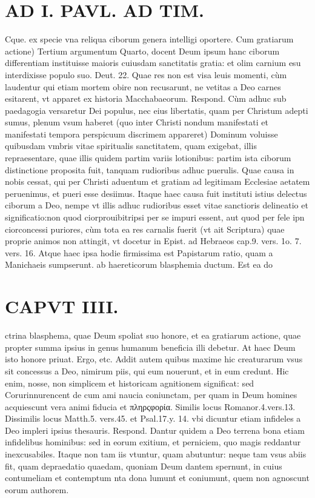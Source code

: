 \documentclass{article}
\begin{document}
\begin{pages}
\section*{AD I. PAVL. AD TIM. }
\marginpar{[ p.194 ]}\pstart Cque. ex specie vna reliqua ciborum genera intelligi oportere.  \pend\pstart Cum gratiarum actione) Tertium argumentum  \pend\pstart Quarto, docent Deum ipsum hanc ciborum differentiam instituisse maioris cuiusdam sanctitatis gratia: et olim carnium esu interdixisse populo suo. Deut. 22. Quae res non est visa leuis momenti, cùm laudentur qui etiam mortem obire non recusarunt, ne vetitas a Deo carnes esitarent, vt apparet ex historia Macchabaeorum. Respond. Cùm adhuc sub paedagogia versaretur Dei populus, nec eius libertatis, quam per Christum adepti sumus, plenum vsum haberet (quo inter Christi nondum manifestati et manifestati tempora perspicuum discrimem appareret) Dominum voluisse quibusdam vmbris vitae spiritualis sanctitatem, quam exigebat, illis repraesentare, quae illis quidem partim variis lotionibus: partim ista ciborum distinctione proposita fuit, tanquam rudioribus adhuc puerulis. Quae causa in nobis cessat, qui per Christi aduentum et gratiam ad legitimam Ecclesiae aetatem peruenimus, et pueri esse desiimus. Itaque haec causa fuit instituti istius delectus ciborum a Deo, nempe vt illis adhuc rudioribus esset vitae sanctioris delineatio et significatio:non quod ciorprouibitripsi per se impuri essent, aut quod per fele ipn ciorconcessi puriores, cùm tota ea res carnalis fuerit (vt ait Scriptura) quae proprie animos non attingit, vt docetur in Epist. ad Hebraeos cap.9. vers. 1o. 7. vers. 16. Atque haec ipsa hodie firmissima est Papistarum ratio, quam a Manichaeis sumpserunt.  \pend\pstart ab haereticorum blasphemia ductum. Est ea do\pend
\section*{CAPVT  IIII. }
\marginpar{[ p.195 ]}\pstart ctrina blasphema, quae Deum spoliat suo honore, et ea gratiarum actione, quae propter summa ipsius in genus humanum beneficia illi debetur. At haec Deum isto honore priuat. Ergo, etc. Addit autem quibus maxime hic creaturarum vsus sit concessus a Deo, nimirum piis, qui eum nouerunt, et in eum credunt. Hic enim, nosse, non simplicem et historicam agnitionem significat: sed Corurinnurencent de cum ami naucia coniunctam, per quam in Deum homines acquiescunt vera animi fiducia et πληρςφορία. Similis locus Romanor.4.vers.13.  \pend\pstart Dissimilis locus Matth.5. vers.45. et Psal.17.y. 14. vbi dicuntur etiam infideles a Deo impleri ipsius thesauris. Respond. Dantur quidem a Deo terrena bona etiam infidelibus hominibus: sed in eorum exitium, et perniciem, quo magis reddantur inexcusabiles. Itaque non tam iis vtuntur, quam abutuntur: neque tam vsus abiis fit, quam depraedatio quaedam, quoniam Deum dantem spernunt, in cuius contumeliam et contemptum nta dona lumunt et coniumunt, quem non agnoscunt eorum authorem.  \pend
{}
{}

\end{pages}
\end{document}
